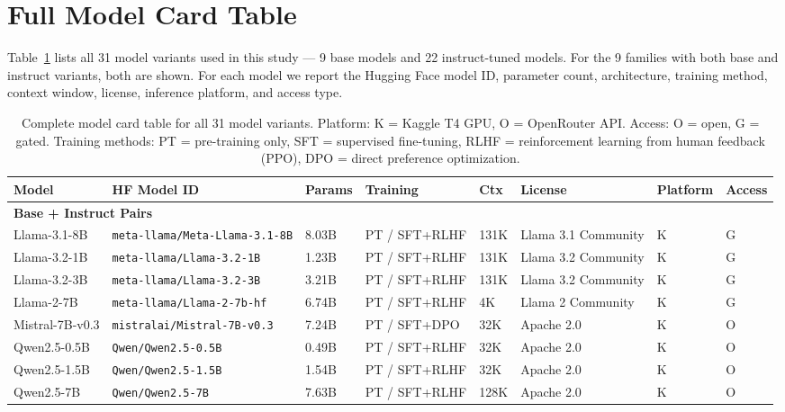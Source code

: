 \section{Full Model Card Table}
\label{app:model_details}

Table~\ref{tab:all_models} lists all 31 model variants used in this study — 9 base models and 22 instruct-tuned models. For the 9 families with both base and instruct variants, both are shown. For each model we report the Hugging Face model ID, parameter count, architecture, training method, context window, license, inference platform, and access type.

\begin{table}[h]
\centering\small
\caption{Complete model card table for all 31 model variants. Platform: K = Kaggle T4 GPU, O = OpenRouter API. Access: O = open, G = gated. Training methods: PT = pre-training only, SFT = supervised fine-tuning, RLHF = reinforcement learning from human feedback (PPO), DPO = direct preference optimization.}
\label{tab:all_models}
\begin{tabular}{llllllll}
\toprule
\textbf{Model} & \textbf{HF Model ID} & \textbf{Params} & \textbf{Training} & \textbf{Ctx} & \textbf{License} & \textbf{Platform} & \textbf{Access} \\
\midrule
\multicolumn{8}{l}{\textbf{Base + Instruct Pairs}} \\
\midrule
Llama-3.1-8B & \texttt{meta-llama/Meta-Llama-3.1-8B} & 8.03B & PT / SFT+RLHF & 131K & Llama 3.1 Community & K & G \\
Llama-3.2-1B & \texttt{meta-llama/Llama-3.2-1B} & 1.23B & PT / SFT+RLHF & 131K & Llama 3.2 Community & K & G \\
Llama-3.2-3B & \texttt{meta-llama/Llama-3.2-3B} & 3.21B & PT / SFT+RLHF & 131K & Llama 3.2 Community & K & G \\
Llama-2-7B & \texttt{meta-llama/Llama-2-7b-hf} & 6.74B & PT / SFT+RLHF & 4K & Llama 2 Community & K & G \\
Mistral-7B-v0.3 & \texttt{mistralai/Mistral-7B-v0.3} & 7.24B & PT / SFT+DPO & 32K & Apache 2.0 & K & O \\
Qwen2.5-0.5B & \texttt{Qwen/Qwen2.5-0.5B} & 0.49B & PT / SFT+RLHF & 32K & Apache 2.0 & K & O \\
Qwen2.5-1.5B & \texttt{Qwen/Qwen2.5-1.5B} & 1.54B & PT / SFT+RLHF & 32K & Apache 2.0 & K & O \\
Qwen2.5-7B & \texttt{Qwen/Qwen2.5-7B} & 7.63B & PT / SFT+RLHF & 128K & Apache 2.0 & K & O \\

\end{tabular}
\end{table}
